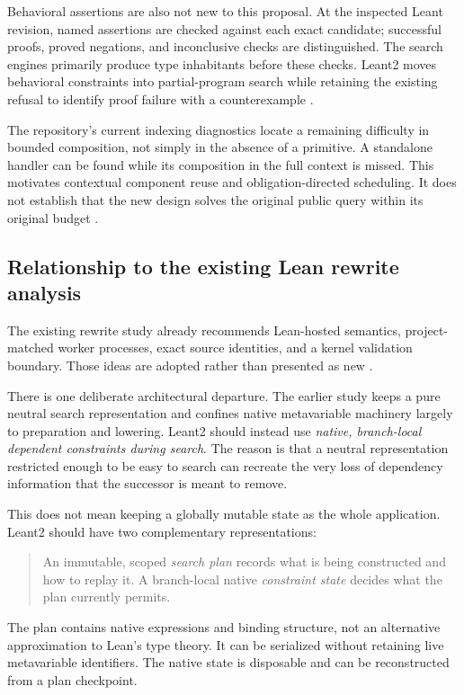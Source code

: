 \documentclass[11pt,a4paper]{article}
\newcommand{\code}[1]{\texttt{\detokenize{#1}}}
\theoremstyle{remark}
\begin{document}
Behavioral assertions are also not new to this proposal. At the inspected Leant revision, named assertions are checked against each exact candidate; successful proofs, proved negations, and inconclusive checks are distinguished. The search engines primarily produce type inhabitants before these checks. Leant2 moves behavioral constraints into partial-program search while retaining the existing refusal to identify proof failure with a counterexample \cite{leant-behavior}.

The repository's current indexing diagnostics locate a remaining difficulty in bounded composition, not simply in the absence of a primitive. A standalone handler can be found while its composition in the full context is missed. This motivates contextual component reuse and obligation-directed scheduling. It does not establish that the new design solves the original public query within its original budget \cite{leant-indexing}.

\subsection{Relationship to the existing Lean rewrite analysis}

The existing rewrite study already recommends Lean-hosted semantics, project-matched worker processes, exact source identities, and a kernel validation boundary. Those ideas are adopted rather than presented as new \cite{rewrite-study}.

There is one deliberate architectural departure. The earlier study keeps a pure neutral search representation and confines native metavariable machinery largely to preparation and lowering. Leant2 should instead use \emph{native, branch-local dependent constraints during search}. The reason is that a neutral representation restricted enough to be easy to search can recreate the very loss of dependency information that the successor is meant to remove.

This does not mean keeping a globally mutable \code{MetaM} state as the whole application. Leant2 should have two complementary representations:
\begin{quote}
An immutable, scoped \emph{search plan} records what is being constructed and how to replay it. A branch-local native \emph{constraint state} decides what the plan currently permits.
\end{quote}
The plan contains native expressions and binding structure, not an alternative approximation to Lean's type theory. It can be serialized without retaining live metavariable identifiers. The native state is disposable and can be reconstructed from a plan checkpoint.
\end{document}
